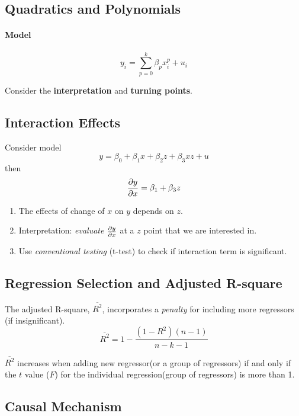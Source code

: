 \documentclass[]{article}
\begin{document}
    	\subsection{Quadratics and Polynomials}
    		\paragraph{Model}
    			\[
    				y_i = \sum_{p=0}^k {\beta_p x_{i}^p} + u_i
    			\]
    		\begin{remark}
    			Consider the \textbf{interpretation} and \textbf{turning points}.
    		\end{remark}
    	\subsection{Interaction Effects}
    		\par Consider model
    		\[
    			y = \beta_0 + \beta_1 x + \beta_2 z + \beta_3 xz + u
    		\]
    		then 
    		\[
    			\frac{\partial{y}}{\partial{x}} = \beta_1 + \beta_3 z
    		\]
    		\begin{enumerate}
    			\item The effects of change of $x$ on $y$ depends on $z$.
    			\item Interpretation: \emph{evaluate} $\frac{\partial{y}}{\partial{x}}$ at a $z$ point that we are interested in.
    			\item Use \emph{conventional testing} (t-test) to check if interaction term is significant.
    		\end{enumerate}
    	\subsection{Regression Selection and Adjusted R-square}
    		\par The adjusted R-square, $\overline{R^2}$, incorporates a \emph{penalty} for including more regressors (if insignificant).
    		\[
    			\overline{R^2} = 1 - \frac{(1-R^2)(n-1)}{n-k-1}
    		\]
    		\begin{remark}
    			$\overline{R^2}$ increases when adding new regressor(or a group of regressors) if and only if the $t$ value ($F$) for the individual regression(group of regressors) is more than 1.
    		\end{remark}
    	
    	\subsection{Causal Mechanism}
    	
\end{document}
